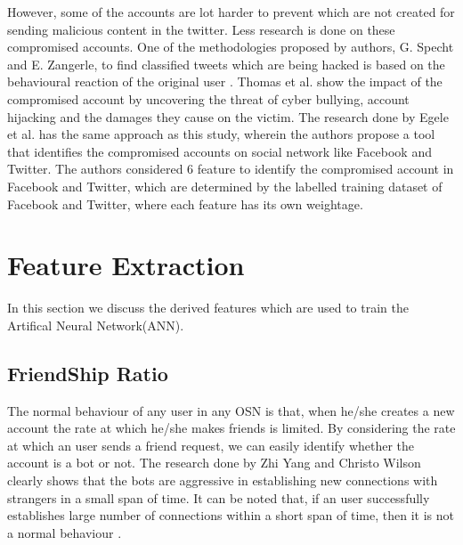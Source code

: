 \documentclass[conference]{IEEEtran}
\begin{document}
However, some of the accounts are lot harder to prevent which are not created for sending malicious content in the twitter. Less research is done on these compromised accounts. One of the methodologies proposed by authors, G. Specht and  E. Zangerle, to find classified tweets which are being hacked is based on the behavioural reaction of the original user \cite{8}. Thomas et al. \cite{9} show the impact of the compromised account by uncovering the threat of cyber bullying, account hijacking and the damages they cause on the victim. The research done by Egele et al. \cite{10}  has the same approach as this study, wherein the authors propose a tool that identifies the compromised accounts on social network like Facebook and Twitter. The authors considered 6 feature to identify the compromised account in Facebook and Twitter, which are determined by the labelled training dataset of Facebook and Twitter, where each feature has its own weightage.

\section{Feature Extraction}
\label{featureDescription}
In this section we discuss the derived features which are used to train the Artifical Neural Network(ANN).

\subsection{FriendShip Ratio}
The normal behaviour of any user in any OSN is that, when he/she creates a new account the rate at which he/she makes friends is limited. 
By considering the rate at which an user sends a friend request, we can easily identify whether the account is a bot or not. 
The research done by Zhi Yang and Christo Wilson clearly shows that the bots are aggressive in establishing new connections 
with strangers in a small span of time. It can be noted that, if an user successfully establishes large 
number of connections within a short span of time, then it is not a normal behaviour \cite{11}.


\end{document}
